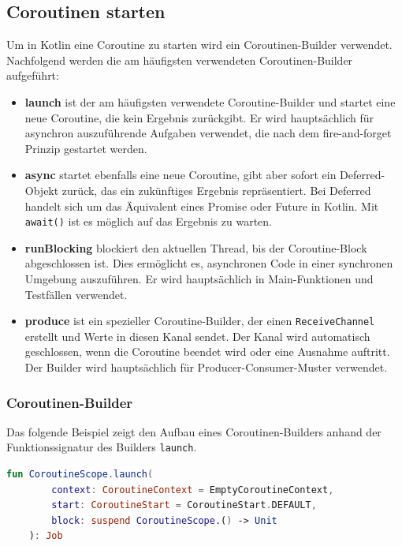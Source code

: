 \documentclass[fontsize=12pt,paper=a4,twoside=semi,parskip=half-,headsepline,headinclude]{scrreprt}
\begin{document}
\subsection{Coroutinen starten}
\label{subsec:corostarten}

Um in Kotlin eine Coroutine zu starten wird ein Coroutinen-Builder verwendet. Nachfolgend werden  die am häufigsten verwendeten Coroutinen-Builder aufgeführt:

\begin{itemize}
	\item \textbf{launch} ist der am häufigsten verwendete Coroutine-Builder und startet eine neue Coroutine, die kein Ergebnis zurückgibt. Er wird hauptsächlich für asynchron auszuführende Aufgaben verwendet, die nach dem fire-and-forget Prinzip gestartet werden.
	\item \textbf{async} startet ebenfalls eine neue Coroutine, gibt aber sofort ein Deferred-Objekt zurück, das ein zukünftiges Ergebnis repräsentiert. Bei Deferred handelt sich um das Äquivalent eines Promise oder Future in Kotlin. Mit \texttt{await()} ist es möglich auf das Ergebnis zu warten.
	\item \textbf{runBlocking} blockiert den aktuellen Thread, bis der Coroutine-Block abgeschlossen ist. Dies ermöglicht es, asynchronen Code in einer synchronen Umgebung auszuführen. Er wird hauptsächlich in Main-Funktionen und Testfällen verwendet.
	\item \textbf{produce} ist ein spezieller Coroutine-Builder, der einen \texttt{ReceiveChannel} erstellt und Werte in diesen Kanal sendet. Der Kanal wird automatisch geschlossen, wenn die Coroutine beendet wird oder eine Ausnahme auftritt. Der Builder wird hauptsächlich für Producer-Consumer-Muster verwendet.
\end{itemize}


\subsubsection{Coroutinen-Builder}

Das folgende Beispiel zeigt den Aufbau eines Coroutinen-Builders anhand der Funktionssignatur des Builders \texttt{launch}.

\begin{lstlisting}[language=Kotlin]
	fun CoroutineScope.launch(
		context: CoroutineContext = EmptyCoroutineContext,
		start: CoroutineStart = CoroutineStart.DEFAULT,
		block: suspend CoroutineScope.() -> Unit
	): Job
\end{lstlisting}
\end{document}
